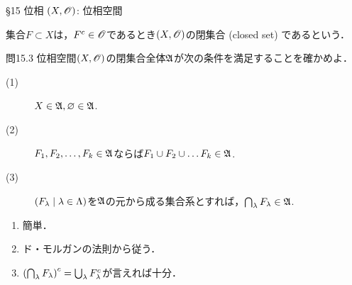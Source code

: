 \documentclass[uplatex,a4paper,dvipdfmx,aspectratio=169,11pt]{beamer}
\begin{document}
\begin{frame}[fragile]{\S 15 位相}
    $(X, \mathscr{O})$: 位相空間

    \medskip{}

    集合$F \subset X$は，$F^c \in \mathscr{O}$であるとき$(X, \mathscr{O})$の\alert{閉集合} (closed set) であるという．

    \begin{exampleblock}{問15.3}
        位相空間$(X, \mathscr{O})$の閉集合全体$\mathfrak{A}$が次の条件を満足することを確かめよ．
        \begin{description}
            \item[(1)] $X \in \mathfrak{A}, \varnothing \in \mathfrak{A}$.
            \item[(2)] $F_1, F_2, \ldots, F_k \in \mathfrak{A}$ならば$F_1 \cup F_2 \cup \dots F_k \in \mathfrak{A}$.
            \item[(3)] $\qty(F_\lambda \mid \lambda \in \Lambda)$を$\mathfrak{A}$の元から成る集合系とすれば，$\bigcap_\lambda F_\lambda \in \mathfrak{A}$.
        \end{description}
    \end{exampleblock}

    \medskip{}

        \begin{enumerate}
            \item[(1)] 簡単．
            \item[(2)] ド・モルガンの法則から従う．
            \item[(3)] $\qty(\bigcap_\lambda F_\lambda)^c = \bigcup_\lambda F_\lambda^c$が言えれば十分．
        \end{enumerate}

\end{frame}
\end{document}
